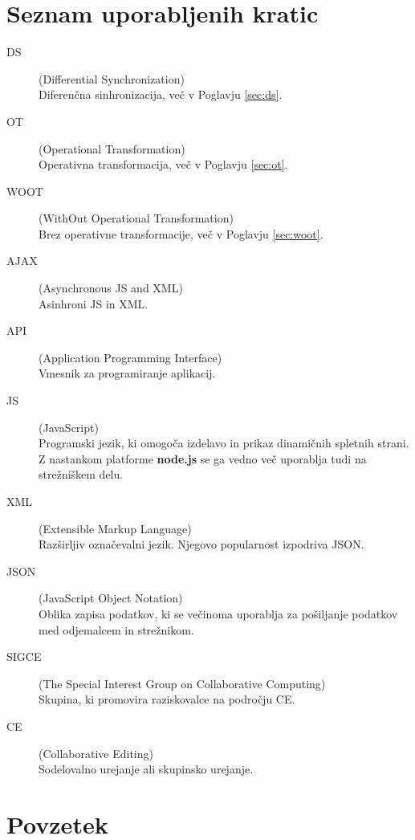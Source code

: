 \documentclass[a4paper, 12pt, twoside]{book}
\newcommand{\clearemptydoublepage}{\newpage{\pagestyle{empty}\cleardoublepage}} %
\begin{document}
\chapter*{Seznam uporabljenih kratic}
\begin{description}
    \item[DS] (Differential Synchronization) \\Diferenčna sinhronizacija, več v Poglavju \ref{sec:ds}.
	\item[OT] (Operational Transformation) \\Operativna transformacija, več v Poglavju \ref{sec:ot}.
	\item[WOOT] (WithOut Operational Transformation) \\Brez operativne transformacije, več v Poglavju \ref{sec:woot}.
	\item[AJAX] (Asynchronous JS and XML) \\Asinhroni JS in XML.
	\item[API] (Application Programming Interface) \\Vmesnik za programiranje aplikacij.
	\item[JS] (JavaScript) \\Programski jezik, ki omogoča izdelavo in prikaz dinamičnih spletnih strani. Z nastankom platforme \textbf{node.js} se ga vedno več uporablja tudi na strežniškem delu.
	\item[XML] (Extensible Markup Language) \\Razširljiv označevalni jezik. Njegovo popularnost izpodriva JSON.
    \item[JSON] (JavaScript Object Notation) \\Oblika zapisa podatkov, ki se večinoma uporablja za pošiljanje podatkov med odjemalcem in strežnikom.
	\item[SIGCE] (The Special Interest Group on Collaborative Computing) \\Skupina, ki promovira raziskovalce na področju CE.
    \item[CE] (Collaborative Editing) \\Sodelovalno urejanje ali skupinsko urejanje.
\end{description}

\clearemptydoublepage

\chapter*{Povzetek}
\end{document}

